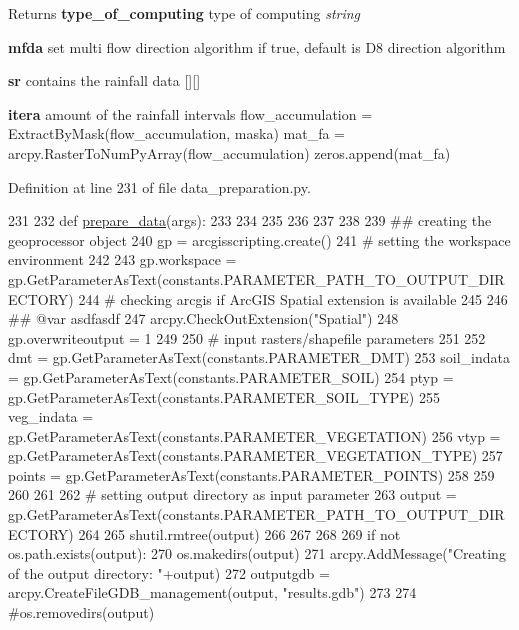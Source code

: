 \begin{DoxyReturn}{Returns}
{\bfseries type\-\_\-of\-\_\-computing} type of computing {\itshape string} 

{\bfseries mfda} set multi flow direction algorithm if true, default is D8 direction algorithm 

{\bfseries sr} contains the rainfall data \mbox{[}\mbox{]}\mbox{[}\mbox{]} 

{\bfseries itera} amount of the rainfall intervals flow\-\_\-accumulation = Extract\-By\-Mask(flow\-\_\-accumulation, maska) mat\-\_\-fa = arcpy.\-Raster\-To\-Num\-Py\-Array(flow\-\_\-accumulation) zeros.\-append(mat\-\_\-fa) 
\end{DoxyReturn}


Definition at line 231 of file data\-\_\-preparation.\-py.


\begin{DoxyCode}
231 
232 \textcolor{keyword}{def }\hyperlink{namespacesmoderp2d_1_1src_1_1data__preparation_abe49c44911df9f3510eaad8751feab27}{prepare\_data}(args):
233 
234 
235 
236 
237 
238 
239   \textcolor{comment}{## creating the geoprocessor object
}
240   gp = arcgisscripting.create()
241   \textcolor{comment}{# setting the workspace environment
}
242 
243   gp.workspace = gp.GetParameterAsText(constants.PARAMETER\_PATH\_TO\_OUTPUT\_DIRECTORY)
244   \textcolor{comment}{# checking arcgis if ArcGIS Spatial extension is available
}
245 
246   \textcolor{comment}{## @var asdfasdf
}
247   arcpy.CheckOutExtension(\textcolor{stringliteral}{"Spatial"})
248   gp.overwriteoutput = 1
249 
250   \textcolor{comment}{# input rasters/shapefile parameters
}
251 
252   dmt = gp.GetParameterAsText(constants.PARAMETER\_DMT)
253   soil\_indata = gp.GetParameterAsText(constants.PARAMETER\_SOIL)
254   ptyp = gp.GetParameterAsText(constants.PARAMETER\_SOIL\_TYPE)
255   veg\_indata = gp.GetParameterAsText(constants.PARAMETER\_VEGETATION)
256   vtyp = gp.GetParameterAsText(constants.PARAMETER\_VEGETATION\_TYPE)
257   points = gp.GetParameterAsText(constants.PARAMETER\_POINTS)
258 
259 
260 
261 
262   \textcolor{comment}{# setting output directory as input parameter
}
263   output = gp.GetParameterAsText(constants.PARAMETER\_PATH\_TO\_OUTPUT\_DIRECTORY)
264 
265   shutil.rmtree(output)
266 
267 
268 
269   \textcolor{keywordflow}{if} \textcolor{keywordflow}{not} os.path.exists(output):
270       os.makedirs(output)
271   arcpy.AddMessage(\textcolor{stringliteral}{"Creating of the output directory: "}+output)
272   outputgdb = arcpy.CreateFileGDB\_management(output, \textcolor{stringliteral}{"results.gdb"})
273 
274   \textcolor{comment}{#os.removedirs(output)
}
\end{DoxyCode}
